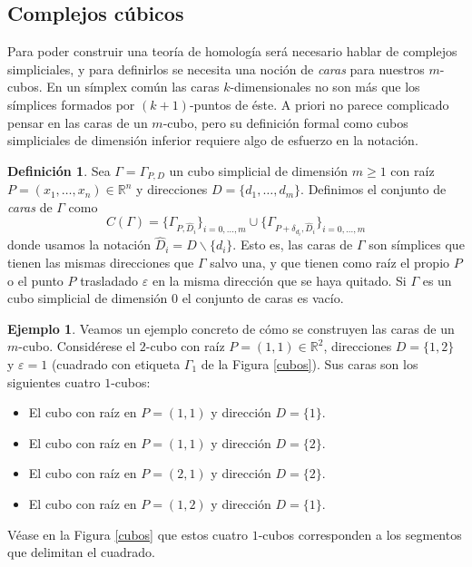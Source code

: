 \documentclass[12pt,a4paper,twoside]{article} %
\theoremstyle{plain}
\theoremstyle{definition}
\newtheorem{definicion}{Definición}[subsection]
\newtheorem{ejemplo}{Ejemplo}[subsection]
\newcommand{\R}{\mathbb{R}}
\begin{document}
\subsection{Complejos cúbicos}

Para poder construir una teoría de homología será necesario hablar de complejos simpliciales, y para definirlos se necesita una noción de \emph{caras} para nuestros $m$-cubos. En un símplex común las caras $k$-dimensionales no son más que los símplices formados por $(k+1)$-puntos de éste. A priori no parece complicado pensar en las caras de un $m$-cubo, pero su definición formal como cubos simpliciales de dimensión inferior requiere algo de esfuerzo en la notación.

\begin{definicion}
Sea $\Gamma = \Gamma_{P,D}$ un cubo simplicial de dimensión $m\geq1$ con raíz $P=(x_1,\dots,x_n)\in\R^n$ y direcciones $D=\{d_1,\dots,d_m\}$. Definimos el conjunto de \emph{caras} de $\Gamma$ como
$$ C(\Gamma) = \lbrace \Gamma_{P,\hat{D}_i} \rbrace_{i=0,\dots,m} \cup \lbrace \Gamma_{P+\delta_{d_i},\hat{D}_i}\rbrace_{i=0,\dots,m}  $$
donde usamos la notación $\hat{D}_i = D\backslash\{d_i\}$. Esto es, las caras de $\Gamma$ son símplices que tienen las mismas direcciones que $\Gamma$ salvo una, y que tienen como raíz el propio $P$ o el punto $P$ trasladado $\varepsilon$ en la misma dirección que se haya quitado. Si $\Gamma$ es un cubo simplicial de dimensión 0 el conjunto de caras es vacío.
\end{definicion}

\begin{ejemplo}
Veamos un ejemplo concreto de cómo se construyen las caras de un $m$-cubo. Considérese el $2$-cubo con raíz $P=(1,1)\in\R^2$, direcciones $D=\{1,2\}$ y $\varepsilon = 1$ (cuadrado con etiqueta $\Gamma_1$ de la Figura \ref{cubos}). Sus caras son los siguientes cuatro $1$-cubos:
\begin{itemize}
\item El cubo con raíz en $P=(1,1)$ y dirección $D=\{1\}$.
\item El cubo con raíz en $P=(1,1)$ y dirección $D=\{2\}$.
\item El cubo con raíz en $P=(2,1)$ y dirección $D=\{2\}$.
\item El cubo con raíz en $P=(1,2)$ y dirección $D=\{1\}$.
\end{itemize}
Véase en la Figura \ref{cubos} que estos cuatro $1$-cubos corresponden a los segmentos que delimitan el cuadrado.
\label{carascuadrado}
\end{ejemplo}
\end{document}
